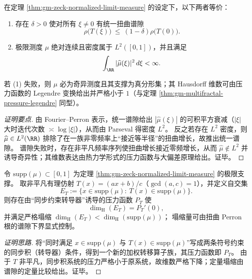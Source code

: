 \begin{theorem}\label{thm:gm-ac-singular-dichotomy}
在定理 \ref{thm:gm-zeck-normalized-limit-measure} 的设定下，以下两者等价：
\begin{enumerate}
  \item 存在 \(\delta>0\) 使对所有 \(\xi\ne 0\) 有统一扭曲谱隙
  \[
  \rho\!\bigl(T(\xi)\bigr)\ \le\ (1-\delta)\rho\!\bigl(T(0)\bigr).
  \]
  \item 极限测度 \(\mu\) 绝对连续且密度属于 \(L^2([0,1])\)，并且满足
  \[
  \int_{\RR}|\widehat\mu(\xi)|^2\,d\xi<\infty.
  \]
\end{enumerate}
若 (1) 失败，则 \(\mu\) 必为奇异测度且其支撑为真分形集；其 Hausdorff 维数可由压力函数的 Legendre 变换给出并严格小于 \(1\)（与定理 \ref{thm:gm-multifractal-pressure-legendre} 同型）。
\end{theorem}


\begin{proof}[证明要点]
由 Fourier--Perron 表示，统一谱隙给出 \(|\widehat\mu(\xi)|\) 的可积平方衰减（\(|\xi|\) 大时迭代次数 \(\asymp \log|\xi|\)），从而由 Parseval 得密度 \(L^2\)。
反之若存在 \(L^2\) 密度，则 \(\widehat\mu\in L^2(\RR)\) 排除了在一族非零频率上“接近等半径”的扭曲增长，故推出统一谱隙。
谱隙失败时，存在非平凡频率序列使扭曲增长接近零频增长，从而 \(\widehat\mu\notin L^2\) 并诱导奇异性；其维数表达由热力学形式的压力函数与大偏差原理给出。证毕。
\end{proof}

\begin{theorem}\label{thm:gm-affine-self-intersection-dimension-drop}
令 \(\mathrm{supp}(\mu)\subset[0,1]\) 为定理 \ref{thm:gm-zeck-normalized-limit-measure} 的极限支撑。
取非平凡有理仿射 \(T(x)=(ax+b)/c\)（\(\gcd(a,c)=1\)），并定义自交集
\[
E_T:=\{x\in \mathrm{supp}(\mu):\ T(x)\in \mathrm{supp}(\mu)\}.
\]
则存在由“同步约束转导器”诱导的压力函数 \(P_T\) 使
\[
\dim_{\mathrm{H}}(E_T)=P_T'(0),
\]
并满足严格塌缩
\(
\dim_{\mathrm{H}}(E_T)<\dim_{\mathrm{H}}(\mathrm{supp}(\mu))
\)；
塌缩量可由扭曲 Perron 根的谱隙下界显式控制。
\end{theorem}

\begin{proof}[证明思路]
将“同时满足 \(x\in\mathrm{supp}(\mu)\) 与 \(T(x)\in\mathrm{supp}(\mu)\)”写成两条符号约束的同步积（转导器）条件，得到一个新的加权转移算子族，其压力函数即 \(P_T\)。
由于 \(T\) 非平凡，同步积系统的压力严格小于原系统，故维数严格下降；定量塌缩由谱隙的定量比较给出。证毕。
\end{proof}

